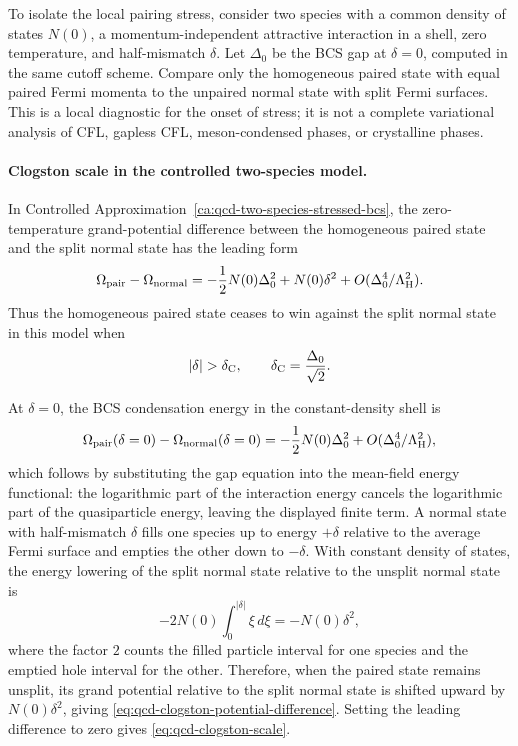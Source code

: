 \begin{controlledapproximation}
\label{ca:qcd-two-species-stressed-bcs}
To isolate the local pairing stress, consider two species with a common
density of states \(N(0)\), a momentum-independent attractive interaction in
a shell, zero temperature, and half-mismatch \(\delta\).  Let \(\Delta_0\) be
the BCS gap at \(\delta=0\), computed in the same cutoff scheme.  Compare only
the homogeneous paired state with equal paired Fermi momenta to the unpaired
normal state with split Fermi surfaces.  This is a local diagnostic for the
onset of stress; it is not a complete variational analysis of CFL, gapless
CFL, meson-condensed phases, or crystalline phases.
\end{controlledapproximation}

\paragraph{Clogston scale in the controlled two-species model.}
In Controlled Approximation~\ref{ca:qcd-two-species-stressed-bcs}, the
zero-temperature grand-potential difference between the homogeneous paired
state and the split normal state has the leading form
\begin{equation}
  \Omega_{\rm pair}-\Omega_{\rm normal}
  =
  -\frac12N(0)\Delta_0^2
  +
  N(0)\delta^2
  +O(\Delta_0^4/\Lambda_{\rm H}^2).
  \label{eq:qcd-clogston-potential-difference}
\end{equation}
Thus the homogeneous paired state ceases to win against the split normal
state in this model when
\begin{equation}
  |\delta|>\delta_{\rm C},
  \qquad
  \delta_{\rm C}=\frac{\Delta_0}{\sqrt2}.
  \label{eq:qcd-clogston-scale}
\end{equation}

At \(\delta=0\), the BCS condensation energy in the constant-density shell is
\[
  \Omega_{\rm pair}(\delta=0)-\Omega_{\rm normal}(\delta=0)
  =
  -\frac12N(0)\Delta_0^2
  +O(\Delta_0^4/\Lambda_{\rm H}^2),
\]
which follows by substituting the gap equation into the mean-field energy
functional: the logarithmic part of the interaction energy cancels the
logarithmic part of the quasiparticle energy, leaving the displayed finite
term.  A normal state with half-mismatch \(\delta\) fills one species up to
energy \(+\delta\) relative to the average Fermi surface and empties the
other down to \(-\delta\).  With constant density of states, the energy
lowering of the split normal state relative to the unsplit normal state is
\[
  -2N(0)\int_0^{|\delta|}\xi\,d\xi
  =
  -N(0)\delta^2,
\]
where the factor \(2\) counts the filled particle interval for one species
and the emptied hole interval for the other.  Therefore, when the paired
state remains unsplit, its grand potential relative to the split normal state
is shifted upward by \(N(0)\delta^2\), giving
\eqref{eq:qcd-clogston-potential-difference}.  Setting the leading
difference to zero gives \eqref{eq:qcd-clogston-scale}.

